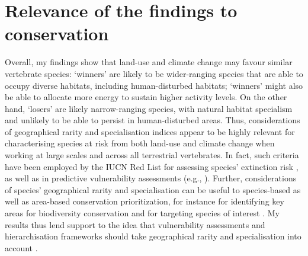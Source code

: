 \section{Relevance of the findings to conservation}
Overall, my findings show that land-use and climate change may favour similar vertebrate species: `winners' are likely to be wider-ranging species that are able to occupy diverse habitats, including human-disturbed habitats; `winners' might also be able to allocate more energy to sustain higher activity levels. On the other hand, `losers' are likely narrow-ranging species, with natural habitat specialism and unlikely to be able to persist in human-disturbed areas. Thus, considerations of geographical rarity and specialisation indices appear to be highly relevant for characterising species at risk from both land-use and climate change when working at large scales and across all terrestrial vertebrates. In fact, such criteria have been employed by the IUCN Red List for assessing species' extinction risk \citep{Rodrigues2006}, as well as in predictive vulnerability assessments (e.g., \citet{Foden2013}). Further, considerations of species' geographical rarity and specialisation can be useful to species-based as well as area-based conservation prioritization, for instance for identifying key areas for biodiversity conservation and for targeting species of interest \citep{Asaad2017, Mace2006}. My results thus lend support to the idea that vulnerability assessments and hierarchisation frameworks should take geographical rarity and specialisation into account \citep{LeBerre2019}.


